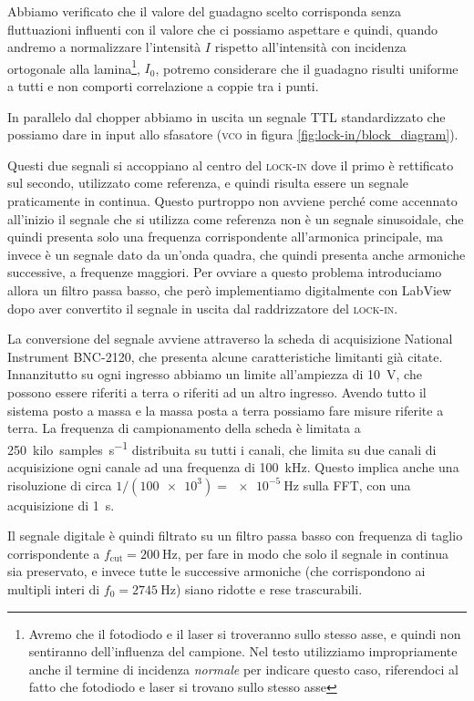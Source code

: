 \documentclass[
    prb,altaffilletter,citeautoscript,
    amsmath,amssymb,
    showpacs,showkeys,floatfix,
    reprint
]{revtex4-1}
\begin{document}
Abbiamo verificato che il valore del guadagno scelto corrisponda senza fluttuazioni influenti con il valore che ci possiamo aspettare e quindi, quando andremo a normalizzare l'intensità $I$ rispetto all'intensità con incidenza ortogonale alla lamina\footnote{Avremo che il fotodiodo e il laser si troveranno sullo stesso asse, e quindi non sentiranno dell'influenza del campione. Nel testo utilizziamo impropriamente anche il termine di incidenza \emph{normale} per indicare questo caso, riferendoci al fatto che fotodiodo e laser si trovano sullo stesso asse}, $I_0$, potremo considerare che il guadagno risulti uniforme a tutti e non comporti correlazione a coppie tra i punti.

In parallelo dal chopper abbiamo in uscita un segnale TTL standardizzato che possiamo dare in input allo sfasatore (\textsc{vco} in figura \ref{fig:lock-in/block_diagram}). 

Questi due segnali si accoppiano al centro del \textsc{lock-in} dove il primo è rettificato sul secondo, utilizzato come referenza, e quindi risulta essere un segnale praticamente in continua. Questo purtroppo non avviene perché come accennato all'inizio il segnale che si utilizza come referenza non è un segnale sinusoidale, che quindi presenta solo una frequenza corrispondente all'armonica principale, ma invece è un segnale dato da un'onda quadra, che quindi presenta anche armoniche successive, a frequenze maggiori. Per ovviare a questo problema introduciamo allora un filtro passa basso, che però implementiamo digitalmente con LabView dopo aver convertito il segnale in uscita dal raddrizzatore del \textsc{lock-in}. 

La conversione del segnale avviene attraverso la scheda di acquisizione National Instrument BNC-2120, che presenta alcune caratteristiche limitanti già citate. Innanzitutto su ogni ingresso abbiamo un limite all'ampiezza di \SI{10}{\volt}, che possono essere riferiti a terra o riferiti ad un altro ingresso. Avendo tutto il sistema posto a massa e la massa posta a terra possiamo fare misure riferite a terra. La frequenza di campionamento della scheda è limitata a \SI{250}{kilo~samples\per\second} distribuita su tutti i canali, che limita su due canali di acquisizione ogni canale ad una frequenza di \SI{100}{\kilo\hertz}. Questo implica anche una risoluzione di circa $1/(\num{100e3})=\SI{e-5}{\hertz}$ sulla FFT, con una acquisizione di \SI{1}{\second}. 

Il segnale digitale è quindi filtrato su un filtro passa basso con frequenza di taglio corrispondente a $f_\mathrm{cut}=\SI{200}{\hertz}$, per fare in modo che solo il segnale in continua sia preservato, e invece tutte le successive armoniche (che corrispondono ai multipli interi di $f_0=\SI{2745}{\hertz}$) siano ridotte e rese trascurabili. 
\end{document}
